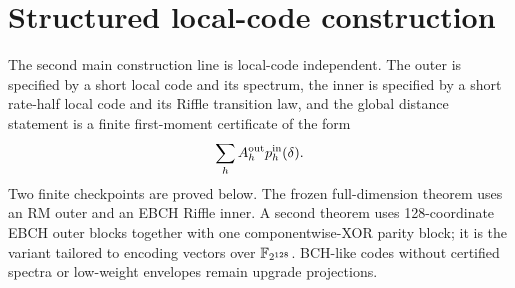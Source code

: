 \section{Structured local-code construction}
\label{sec:structured-local-code}

The second main construction line is local-code independent.  The outer is
specified by a short local code and its spectrum, the inner is specified by a
short rate-half local code and its Riffle transition law, and the global
distance statement is a finite first-moment certificate of the form
\[
\sum_h A_h^{\rm out}p_h^{\rm in}(\delta).
\]
Two finite checkpoints are proved below.  The frozen full-dimension theorem
uses an RM outer and an EBCH Riffle inner.  A second theorem uses 128-coordinate
EBCH outer blocks together with one componentwise-XOR parity block; it is the
variant tailored to encoding vectors over \(\mathbb{F}_{2^{128}}\).  BCH-like codes
without certified spectra or low-weight envelopes remain upgrade projections.





